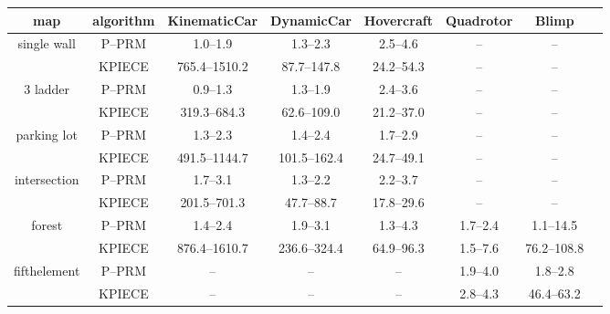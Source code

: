\documentclass{article}
\begin{document}
\begin{tabular}{c c | c c c c c c}
map&algorithm&KinematicCar&DynamicCar&Hovercraft&Quadrotor&Blimp\\\hline
\multirow{2}{*}{single wall}&P--PRM&1.0--1.9&1.3--2.3&2.5--4.6&--&--\\
&KPIECE&765.4--1510.2&87.7--147.8&24.2--54.3&--&--\\
\multirow{2}{*}{3 ladder}&P--PRM&0.9--1.3&1.3--1.9&2.4--3.6&--&--\\
&KPIECE&319.3--684.3&62.6--109.0&21.2--37.0&--&--\\
\multirow{2}{*}{parking lot}&P--PRM&1.3--2.3&1.4--2.4&1.7--2.9&--&--\\
&KPIECE&491.5--1144.7&101.5--162.4&24.7--49.1&--&--\\
\multirow{2}{*}{intersection}&P--PRM&1.7--3.1&1.3--2.2&2.2--3.7&--&--\\
&KPIECE&201.5--701.3&47.7--88.7&17.8--29.6&--&--\\
\multirow{2}{*}{forest}&P--PRM&1.4--2.4&1.9--3.1&1.3--4.3&1.7--2.4&1.1--14.5\\
&KPIECE&876.4--1610.7&236.6--324.4&64.9--96.3&1.5--7.6&76.2--108.8\\
\multirow{2}{*}{fifthelement}&P--PRM&--&--&--&1.9--4.0&1.8--2.8\\
&KPIECE&--&--&--&2.8--4.3&46.4--63.2\\
\end{tabular}
\end{document}
